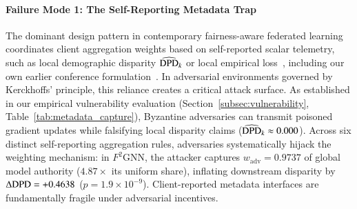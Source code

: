 \paragraph{Failure Mode 1: The Self-Reporting Metadata Trap}
The dominant design pattern in contemporary fairness-aware federated learning coordinates client aggregation weights based on self-reported scalar telemetry, such as local demographic disparity $\widehat{\mathrm{DPD}}_k$ or local empirical loss~\citep{ezzeldin2023fairfed, zhou2026fairgfl, f2gnn2023, khan2026fedgraphfair}, including our own earlier conference formulation~\citep{dang2026fedfairgnn}. In adversarial environments governed by Kerckhoffs' principle, this reliance creates a critical attack surface. As established in our empirical vulnerability evaluation (Section~\ref{subsec:vulnerability}, Table~\ref{tab:metadata_capture}), Byzantine adversaries can transmit poisoned gradient updates while falsifying local disparity claims ($\widehat{\mathrm{DPD}}_k \approx 0.000$). Across six distinct self-reporting aggregation rules, adversaries systematically hijack the weighting mechanism: in $F^2\text{GNN}$, the attacker captures $w_{\mathrm{adv}} = 0.9737$ of global model authority ($4.87\times$ its uniform share), inflating downstream disparity by $\Delta\mathrm{DPD} = +0.4638$ ($p = 1.9 \times 10^{-9}$). Client-reported metadata interfaces are fundamentally fragile under adversarial incentives.

